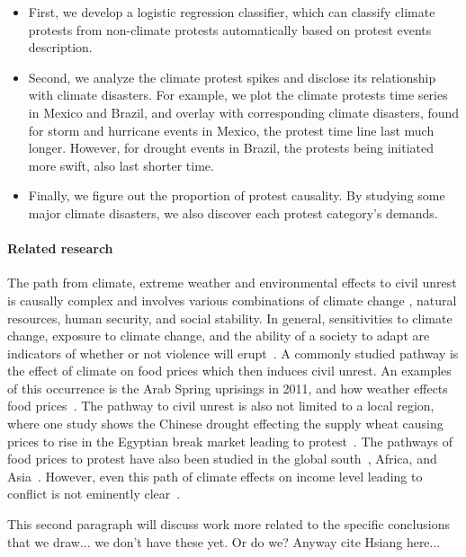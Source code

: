 \documentclass[9pt,twocolumn,twoside]{pnas-new}
\begin{document}
\begin{itemize}
  \item First, we develop a logistic regression classifier, which can classify climate protests from non-climate protests automatically based on protest events description.
  \item Second, we analyze the climate protest spikes and disclose its relationship with climate disasters. For example, we plot the climate protests time series in Mexico and Brazil, and overlay with corresponding climate disasters, found for storm and hurricane events in Mexico, the protest time line last much longer. However, for drought events in Brazil, the protests being initiated more swift, also last shorter time.
  \item Finally, we figure out the proportion of protest causality. By studying some major climate disasters, we also discover each protest category's demands.
\end{itemize}
%

%

%
%
\paragraph{Related research}
The path from climate, extreme weather and environmental effects to civil unrest is causally complex \cite{hsiang2011civil,RW5} and involves various combinations of climate change \cite{burke2014climate}, natural resources, human security, and social stability.
In general, sensitivities to climate change, exposure to climate change, and the ability of a society to adapt are indicators of whether or not violence will erupt~\cite{RW9}.
A commonly studied pathway is the effect of climate on food prices which then induces civil unrest.
An examples of this occurrence is the Arab Spring uprisings in 2011, and how weather effects food prices~\cite{RW2}.
The pathway to civil unrest is also not limited to a local region, where one study shows the Chinese drought effecting the supply wheat causing prices to rise in the Egyptian break market leading to protest~\cite{RW1}.
The pathways of food prices to protest have also been studied in the global south~\cite{RW4}, Africa, and Asia~\cite{wischnath2014climate,RW6}.
However, even this path of climate effects on income level leading to conflict is not eminently clear~\cite{RW10}.

{\color{red} This second paragraph will discuss work more related to the specific conclusions that we draw... we don't have these yet. Or do we? Anyway cite Hsiang here...}
\end{document}
